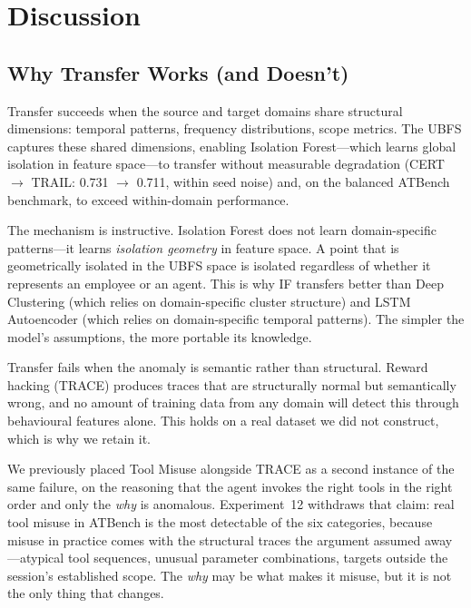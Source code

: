 \documentclass[conference]{IEEEtran}
\begin{document}
\section{Discussion}
\label{sec:discussion}

\subsection{Why Transfer Works (and Doesn't)}

Transfer succeeds when the source and target domains share structural dimensions: temporal patterns, frequency distributions, scope metrics. The UBFS captures these shared dimensions, enabling Isolation Forest---which learns global isolation in feature space---to transfer without measurable degradation (CERT $\to$ TRAIL: 0.731 $\to$ 0.711, within seed noise) and, on the balanced ATBench benchmark, to exceed within-domain performance.

The mechanism is instructive. Isolation Forest does not learn domain-specific patterns---it learns \textit{isolation geometry} in feature space. A point that is geometrically isolated in the UBFS space is isolated regardless of whether it represents an employee or an agent. This is why IF transfers better than Deep Clustering (which relies on domain-specific cluster structure) and LSTM Autoencoder (which relies on domain-specific temporal patterns). The simpler the model's assumptions, the more portable its knowledge.

Transfer fails when the anomaly is semantic rather than structural. Reward hacking (TRACE) produces traces that are structurally normal but semantically wrong, and no amount of training data from any domain will detect this through behavioural features alone. This holds on a real dataset we did not construct, which is why we retain it.

We previously placed Tool Misuse alongside TRACE as a second instance of the same failure, on the reasoning that the agent invokes the right tools in the right order and only the \textit{why} is anomalous. Experiment~12 withdraws that claim: real tool misuse in ATBench is the most detectable of the six categories, because misuse in practice comes with the structural traces the argument assumed away---atypical tool sequences, unusual parameter combinations, targets outside the session's established scope. The \textit{why} may be what makes it misuse, but it is not the only thing that changes.
\end{document}
